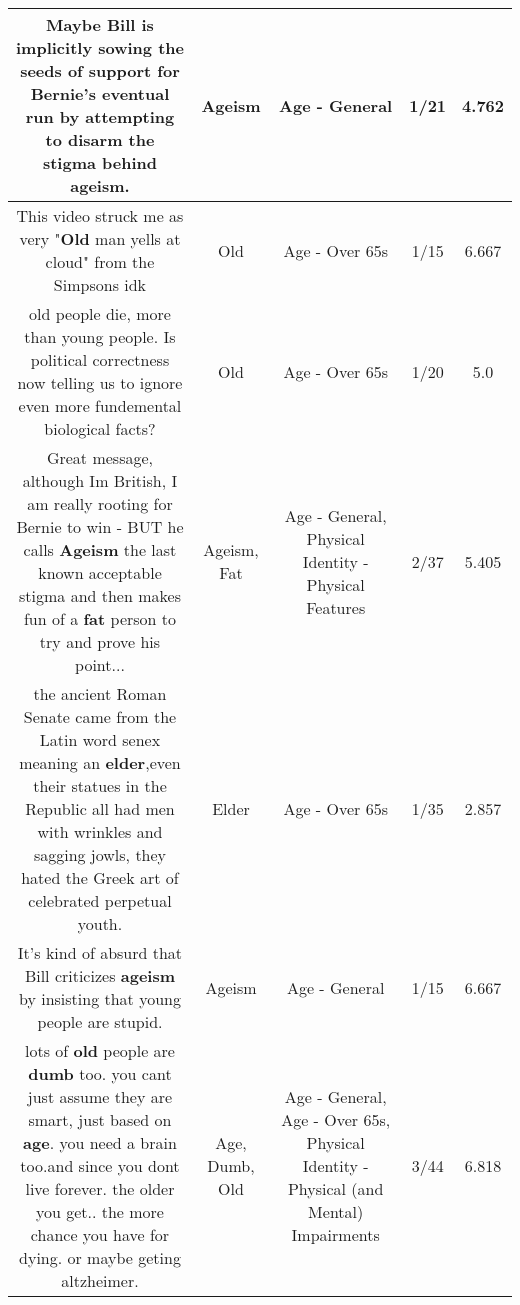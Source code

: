 \documentclass[11pt]{article}
\newlength\mylength
\begin{document}
\begin{center}
\begin{longtable}{|C{.65\mylength}|C{.30\mylength}|C{.12\mylength}|C{.12\mylength}|C{.12\mylength}|}
  \small Maybe Bill is implicitly sowing the seeds of support for Bernie's eventual run by attempting to disarm the stigma behind \textbf{ageism}.\normalsize   & Ageism & Age - General & 1/21 & 4.762 \\  \hline
  \small This video struck me as very "\textbf{Old} man yells at cloud" from the Simpsons idk\normalsize   & Old & Age - Over 65s & 1/15 & 6.667 \\  \hline
  \small old people die, more than young people. Is political correctness now telling us to ignore even more fundemental biological facts?\normalsize   & Old & Age - Over 65s & 1/20 & 5.0 \\  \hline
  \small Great message, although Im British, I am really rooting for Bernie to win - BUT he calls \textbf{Ageism} the last known acceptable stigma and then makes fun of a \textbf{fat} person to try and prove his point...\normalsize   & Ageism, Fat & Age - General, Physical Identity - Physical Features & 2/37 & 5.405 \\  \hline
  \small the ancient Roman Senate came from the Latin word senex meaning an \textbf{elder},even their statues in the Republic all had men with wrinkles and sagging jowls, they hated the Greek art of celebrated perpetual youth.\normalsize   & Elder & Age - Over 65s & 1/35 & 2.857 \\  \hline
  \small It's kind of absurd that Bill criticizes \textbf{ageism} by insisting that young people are stupid.\normalsize   & Ageism & Age - General & 1/15 & 6.667 \\  \hline
  \small lots of \textbf{old} people are \textbf{dumb} too. you cant just assume they are smart, just based on \textbf{age}. you need a brain too.and since you dont live forever. the older you get.. the more chance you have for dying. or maybe geting altzheimer.\normalsize   & Age, Dumb, Old & Age - General, Age - Over 65s, Physical Identity - Physical (and Mental) Impairments & 3/44 & 6.818 \\  \hline

\end{longtable}
\end{center}
\end{document}
